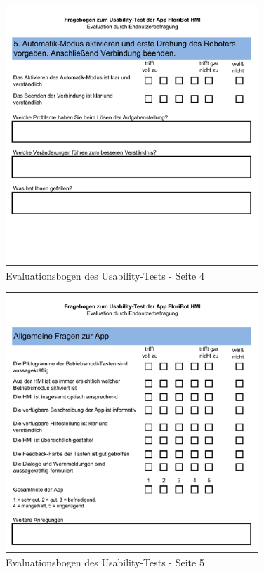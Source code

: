 \newpage
\begin{figure}[H]
	\centering
		\includegraphics[width=0.85\textwidth]{03_Grafiken/Anhang/UsabilityBogen/UsabilityEvaluationsbogen3.png}
	\caption[Evaluationsbogen des Usability-Tests - Seite 4]{Evaluationsbogen des Usability-Tests - Seite 4}
	\label{fig:UsabilityEvaluationsbogen}
\end{figure}
\newpage
\begin{figure}[H]
	\centering
		\includegraphics[width=0.85\textwidth]{03_Grafiken/Anhang/UsabilityBogen/UsabilityEvaluationsbogen4.png}
	\caption[Evaluationsbogen des Usability-Tests - Seite 5]{Evaluationsbogen des Usability-Tests - Seite 5}
	\label{fig:UsabilityEvaluationsbogen}
\end{figure}
\newpage